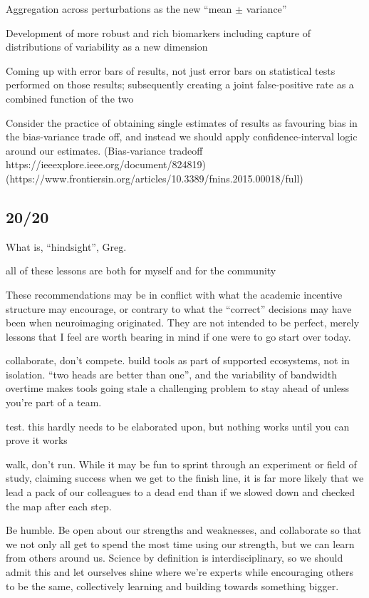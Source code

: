 Aggregation across perturbations as the new ``mean $\pm$ variance''

Development of more robust and rich biomarkers including capture of distributions of variability as a new dimension

Coming up with error bars of results, not just error bars on statistical tests performed on those results; subsequently
creating a joint false-positive rate as a combined function of the two

Consider the practice of obtaining single estimates of results as favouring bias in the bias-variance trade off, and
instead we should apply confidence-interval logic around our estimates.
(Bias-variance tradeoff https://ieeexplore.ieee.org/document/824819)
(https://www.frontiersin.org/articles/10.3389/fnins.2015.00018/full)

\subsection{20/20}
What is, ``hindsight'', Greg. 

all of these lessons are both for myself and for the community

These recommendations may be in conflict with what the academic incentive structure may encourage, or contrary to what
the ``correct'' decisions may have been when neuroimaging originated. They are not intended to be perfect, merely
lessons that I feel are worth bearing in mind if one were to go start over today.

collaborate, don't compete. build tools as part of supported ecosystems, not in isolation. ``two heads are better
than one'', and the variability of bandwidth overtime makes tools going stale a challenging problem to stay ahead of
unless you're part of a team.

test. this hardly needs to be elaborated upon, but nothing works until you can prove it works

walk, don't run. While it may be fun to sprint through an experiment or field of study, claiming success when we get to
the finish line, it is far more likely that we lead a pack of our colleagues to a dead end than if we slowed down and
checked the map after each step.

Be humble. Be open about our strengths and weaknesses, and collaborate so that we not only all get to spend the most
time using our strength, but we can learn from others around us. Science by definition is interdisciplinary, so we
should admit this and let ourselves shine where we're experts while encouraging others to be the same, collectively
learning and building towards something bigger.


